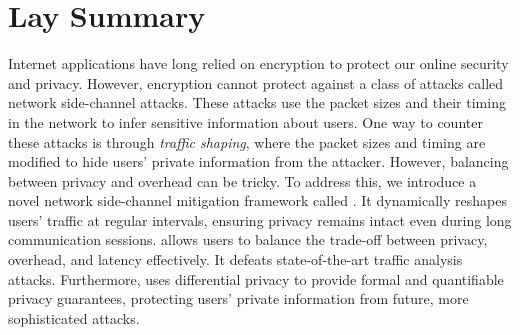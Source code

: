 

\chapter{Lay Summary}
Internet applications have long relied on encryption to protect our online security and privacy.
However, encryption cannot protect against a class of attacks called network side-channel attacks.
These attacks use the packet sizes and their timing in the network to infer sensitive information about users.
One way to counter these attacks is through \emph{traffic shaping}, where the packet sizes and timing are modified to hide users' private information from the attacker.
However, balancing between privacy and overhead can be tricky.
To address this, we introduce a novel network side-channel mitigation framework called {\sys}.
It dynamically reshapes users' traffic at regular intervals, ensuring privacy remains intact even during long communication sessions.
{\sys} allows users to balance the trade-off between privacy, overhead, and latency effectively.
It defeats state-of-the-art traffic analysis attacks.
Furthermore, {\sys} uses differential privacy to provide formal and quantifiable privacy guarantees, protecting users' private information from future, more sophisticated attacks.


